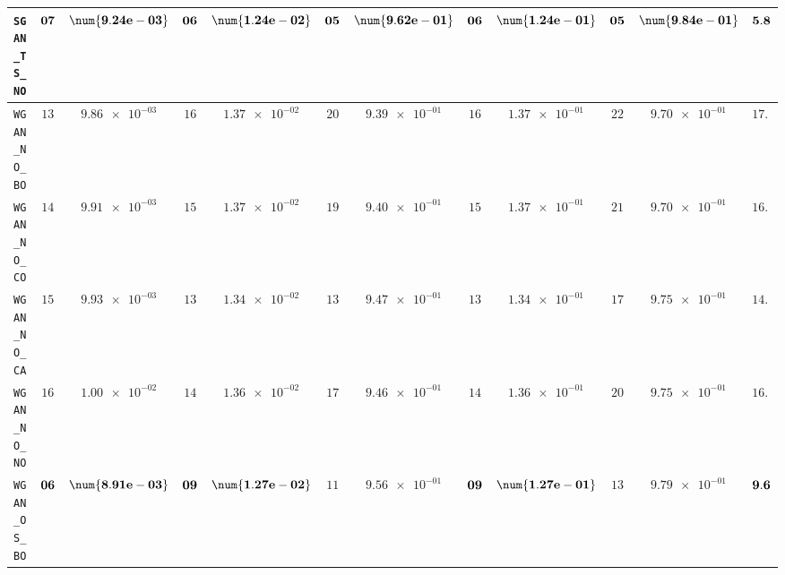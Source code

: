 \begin{table}[H]
\begin{tabularx}{\textwidth}{l||cC|cC|cC|cC|cC||c}
		\texttt{SGAN\_TS\_NO} & $\bf 07$ & $\bf \num{9.24e-03}$ & $\bf 06$ & $\bf \num{1.24e-02}$ & $\bf 05$ & $\bf \num{9.62e-01}$ & $\bf 06$ & $\bf \num{1.24e-01}$ & $\bf 05$ & $\bf \num{9.84e-01}$ & $\bf 5.8$  \\ \hline
		\texttt{WGAN\_NO\_BO} & $ 13$ & $ \num{9.86e-03}$ & $ 16$ & $ \num{1.37e-02}$ & $ 20$ & $ \num{9.39e-01}$ & $ 16$ & $ \num{1.37e-01}$ & $ 22$ & $ \num{9.70e-01}$ & $ 17.4$  \\
		\texttt{WGAN\_NO\_CO} & $ 14$ & $ \num{9.91e-03}$ & $ 15$ & $ \num{1.37e-02}$ & $ 19$ & $ \num{9.40e-01}$ & $ 15$ & $ \num{1.37e-01}$ & $ 21$ & $ \num{9.70e-01}$ & $ 16.8$  \\
		\texttt{WGAN\_NO\_CA} & $ 15$ & $ \num{9.93e-03}$ & $ 13$ & $ \num{1.34e-02}$ & $ 13$ & $ \num{9.47e-01}$ & $ 13$ & $ \num{1.34e-01}$ & $ 17$ & $ \num{9.75e-01}$ & $ 14.2$  \\
		\texttt{WGAN\_NO\_NO} & $ 16$ & $ \num{1.00e-02}$ & $ 14$ & $ \num{1.36e-02}$ & $ 17$ & $ \num{9.46e-01}$ & $ 14$ & $ \num{1.36e-01}$ & $ 20$ & $ \num{9.75e-01}$ & $ 16.2$  \\
		\texttt{WGAN\_OS\_BO} & $\bf 06$ & $\bf \num{8.91e-03}$ & $\bf 09$ & $\bf \num{1.27e-02}$ & $ 11$ & $ \num{9.56e-01}$ & $\bf 09$ & $\bf \num{1.27e-01}$ & $ 13$ & $ \num{9.79e-01}$ & $\bf 9.6$  \\

\end{tabularx}
\end{table}
